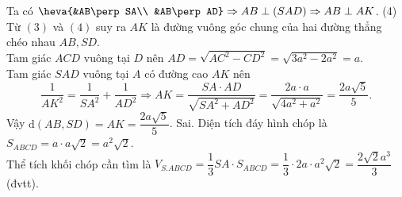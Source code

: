 \begin{ex}
{\begin{itemchoice}
			Ta có $\heva{&AB\perp SA\\ &AB\perp AD} \Rightarrow AB\perp(SAD) \Rightarrow AB\perp AK$.	\hfill(4)\\
			Từ $(3)$ và $(4)$ suy ra $AK$ là đường vuông góc chung của hai đường thẳng chéo nhau ${AB, SD}$.\\
			Tam giác $ACD$ vuông tại $D$ nên $AD=\sqrt{AC^2-CD^2}=\sqrt{3a^2-2a^2}=a$.\\
			Tam giác $SAD$ vuông tại $A$ có đường cao $AK$ nên
			$$\dfrac{1}{AK^2}=\dfrac{1}{SA^2}+\dfrac{1}{AD^2} \Rightarrow AK=\dfrac{SA\cdot AD}{\sqrt{SA^2+AD^2}}=\dfrac{2a\cdot a}{\sqrt{4a^2+a^2}}=\dfrac{2a \sqrt{5}}{5}.$$
			Vậy $\mathrm{d}(AB, SD)=AK=\dfrac{2a\sqrt{5}}{5}$.
			\itemch Sai. Diện tích đáy hình chóp là $S_{ABCD}=a \cdot a \sqrt{2}=a^2\sqrt{2}$.\\
			Thể tích khối chóp cần tìm là
			$V_{S.ABCD}=\dfrac{1}{3}SA\cdot S_{ABCD}=\dfrac{1}{3}\cdot 2a\cdot a^2\sqrt{2}=\dfrac{2\sqrt{2}a^3}{3}$ (đvtt).
		\end{itemchoice}
	}
\end{ex}

